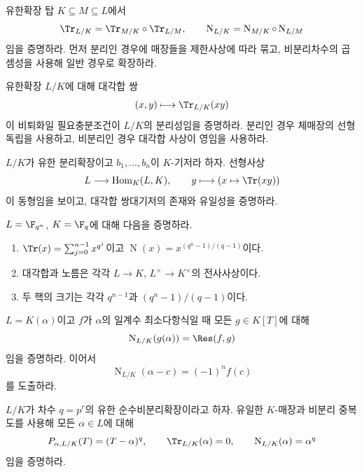 \begin{exercise}[*]
\label{ex:prove-norm-trace-transitivity}
유한확장 탑 $K\subseteq M\subseteq L$에서
\[
  \Tr_{L/K}=\Tr_{M/K}\circ\Tr_{L/M},
  \qquad
  \operatorname N_{L/K}
  =\operatorname N_{M/K}\circ\operatorname N_{L/M}
\]
임을 증명하라. 먼저 분리인 경우에 매장들을 제한사상에 따라 묶고, 비분리차수의 곱셈성을 사용해 일반 경우로 확장하라.
\end{exercise}

\begin{exercise}[*]
\label{ex:prove-trace-pairing-criterion}
유한확장 $L/K$에 대해 대각합 쌍
\[
  (x,y)\longmapsto\Tr_{L/K}(xy)
\]
이 비퇴화일 필요충분조건이 $L/K$의 분리성임을 증명하라. 분리인 경우 체매장의 선형독립을 사용하고, 비분리인 경우 대각합 사상이 영임을 사용하라.
\end{exercise}

\begin{exercise}
$L/K$가 유한 분리확장이고 $b_1,\dots,b_n$이 $K$-기저라 하자. 선형사상
\[
  L\longrightarrow\operatorname{Hom}_K(L,K),
  \qquad
  y\longmapsto(x\mapsto\Tr(xy))
\]
이 동형임을 보이고, 대각합 쌍대기저의 존재와 유일성을 증명하라.
\end{exercise}

\begin{exercise}[*]
\label{ex:finite-field-norm-trace-surjectivity}
$L=\F_{q^n}$, $K=\F_q$에 대해 다음을 증명하라.
\begin{enumerate}[label=(\alph*)]
  \item $\Tr(x)=\sum_{j=0}^{n-1}x^{q^j}$이고 $\operatorname N(x)=x^{(q^n-1)/(q-1)}$이다.
  \item 대각합과 노름은 각각 $L\to K$, $L^\times\to K^\times$의 전사사상이다.
  \item 두 핵의 크기는 각각 $q^{n-1}$과 $(q^n-1)/(q-1)$이다.
\end{enumerate}
\end{exercise}

\begin{exercise}[*]
\label{ex:prove-norm-resultant}
$L=K(\alpha)$이고 $f$가 $\alpha$의 일계수 최소다항식일 때 모든 $g\in K[T]$에 대해
\[
  \operatorname N_{L/K}(g(\alpha))=\Res(f,g)
\]
임을 증명하라. 이어서
\[
  \operatorname N_{L/K}(\alpha-c)=(-1)^n f(c)
\]
를 도출하라.
\end{exercise}

\begin{exercise}[*]
\label{ex:purely-inseparable-trace-norm}
$L/K$가 차수 $q=p^r$의 유한 순수비분리확장이라고 하자. 유일한 $K$-매장과 비분리 중복도를 사용해 모든 $\alpha\in L$에 대해
\[
  P_{\alpha,L/K}(T)=(T-\alpha)^q,
  \qquad
  \Tr_{L/K}(\alpha)=0,
  \qquad
  \operatorname N_{L/K}(\alpha)=\alpha^q
\]
임을 증명하라.
\end{exercise}

